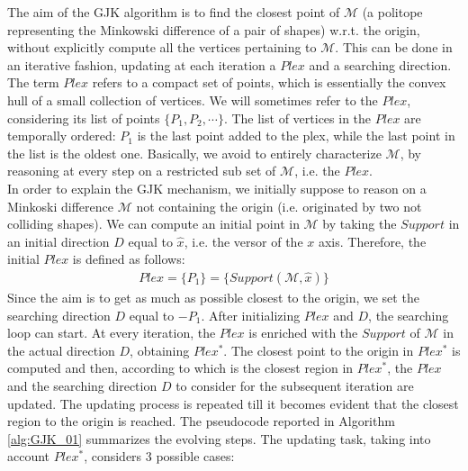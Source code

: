 \documentclass{article}
\begin{document}
The aim of the GJK algorithm is to find the closest point of $\mathcal{M}$ (a politope representing the Minkowski difference of a pair of shapes) w.r.t. the origin, without explicitly compute all the vertices pertaining to $\mathcal{M}$.
This can be done in an iterative fashion, updating at each iteration a $Plex$ and a searching direction. The term $Plex$ refers to a compact set of points, which is essentially the convex hull of a small collection of vertices. We will sometimes refer to the $Plex$, considering its list of points $ \lbrace P_1, P_2, \cdots \rbrace$. The list of vertices in the $Plex$ are temporally ordered: $P_1$ is the last point added to the plex, while the last point in the list is the oldest one. 
Basically, we avoid to entirely characterize $\mathcal{M}$,  by reasoning at every step on a restricted sub set of $\mathcal{M}$, i.e. the $Plex$.
\\
In order to explain the GJK mechanism, we initially suppose to reason on a Minkoski difference $\mathcal{M}$ not containing the origin (i.e. originated by two not colliding shapes). We can compute an initial point in $\mathcal{M}$ by taking the $Support$ in an initial direction $D$ equal to $\hat{x}$, i.e. the versor of the $x$ axis. Therefore, the initial $Plex$ is defined as follows:
\begin{eqnarray}
Plex = \lbrace P_1 \rbrace = \lbrace Support ( \mathcal{M} , \hat{x} ) \rbrace
\end{eqnarray}
Since the aim is to get as much as possible closest to the origin, we set the searching direction $D$ equal to $-P_1$.
After initializing $Plex$ and $D$, the searching loop can start. At every iteration, the $Plex$ is enriched with the $Support$ of $\mathcal{M}$ in the actual direction $D$, obtaining $Plex^*$. The closest point to the origin in $Plex^*$ is computed and then, according to which is the closest region in $Plex^*$, the $Plex$ and the searching direction $D$ to consider for the subsequent iteration are updated. The updating process is repeated till it becomes evident that the closest region to the origin is reached.
The pseudocode reported in Algorithm \ref{alg:GJK_01} summarizes the evolving steps.
The updating task, taking into account $Plex^*$, considers 3 possible cases:
\end{document}
